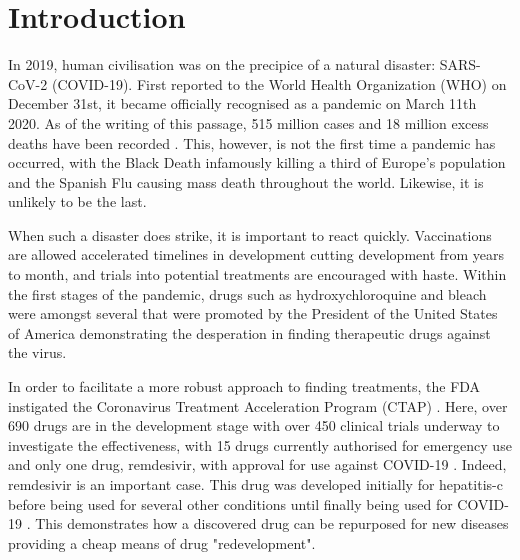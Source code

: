 
\chapter{Introduction}  %

\ifpdf
    \graphicspath{{Chapter1/Figs/Raster/}{Chapter1/Figs/PDF/}{Chapter1/Figs/}}
\else
    \graphicspath{{Chapter1/Figs/Vector/}{Chapter1/Figs/}}
\fi

In 2019, human civilisation was on the precipice of a natural disaster: \mbox{SARS-CoV-2} (\mbox{COVID-19}). First reported to the World Health Organization (WHO) on December 31st, it became officially recognised as a pandemic on March 11th 2020. As of the writing of this passage, 515 million cases and 18 million excess deaths have been recorded \cite{Wan22,WHO22}. This, however, is not the first time a pandemic has occurred, with the Black Death infamously killing a third of Europe's population and the Spanish Flu causing mass death throughout the world. Likewise, it is unlikely to be the last.

When such a disaster does strike, it is important to react quickly. Vaccinations are allowed accelerated timelines in development cutting development from years to month, and trials into potential treatments are encouraged with haste. Within the first stages of the pandemic, drugs such as hydroxychloroquine and bleach were amongst several that were promoted by the President of the United States of America demonstrating the desperation in finding therapeutic drugs against the virus.

In order to facilitate a more robust approach to finding treatments, the FDA instigated the Coronavirus Treatment Acceleration Program (CTAP) \cite{CTAP22}. Here, over 690 drugs are in the development stage with over 450 clinical trials underway to investigate the effectiveness, with 15 drugs currently authorised for emergency use and only one drug, remdesivir, with approval for use against \mbox{COVID-19} \cite{CTAP22}. Indeed, remdesivir is an important case. This drug was developed initially for hepatitis-c before being used for several other conditions until finally being used for \mbox{COVID-19} \cite{Joe20}. This demonstrates how a discovered drug can be repurposed for new diseases providing a cheap means of drug "redevelopment".


